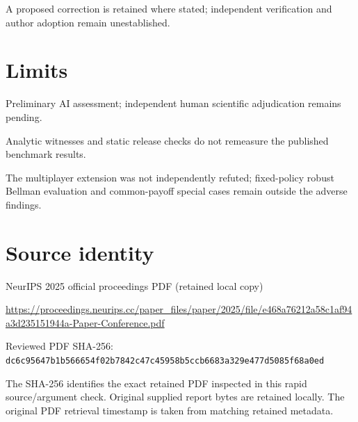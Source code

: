 \documentclass[11pt]{article}
\begin{document}
A proposed correction is retained where stated; independent verification and author adoption remain unestablished.

\section*{Limits}

Preliminary AI assessment; independent human scientific adjudication remains pending.\par

Analytic witnesses and static release checks do not remeasure the published benchmark results.\par

The multiplayer extension was not independently refuted; fixed-policy robust Bellman evaluation and common-payoff special cases remain outside the adverse findings.\par

\section*{Source identity}

NeurIPS 2025 official proceedings PDF (retained local copy)

\url{https://proceedings.neurips.cc/paper_files/paper/2025/file/e468a76212a58c1af94a3d235151944a-Paper-Conference.pdf}

Reviewed PDF SHA-256: \nolinkurl{dc6c95647b1b566654f02b7842c47c45958b5ccb6683a329e477d5085f68a0ed}

The SHA-256 identifies the exact retained PDF inspected in this rapid source/argument check. Original supplied report bytes are retained locally. The original PDF retrieval timestamp is taken from matching retained metadata.
\end{document}
